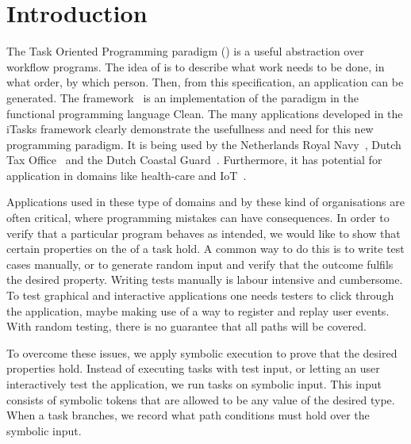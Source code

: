 
\section{Introduction}

The Task Oriented Programming paradigm (\TOP) is a useful abstraction over workflow programs.
The idea of \TOP is to describe what work needs to be done, in what order, by which person.
Then, from this specification, an application can be generated.
The \ITASKS framework~\cite{DBLP:conf/ppdp/PlasmeijerLMAK12} is an implementation of the paradigm in the functional programming language Clean.
The many applications developed in the iTasks framework clearly demonstrate the usefullness and need for this new programming paradigm.
It is being used by the Netherlands Royal Navy~\cite{jansen2018dynamic}, Dutch Tax Office~\cite{conf/sfp/StutterheimAP17} and the Dutch Coastal Guard~\cite{lijnse2012incidone}. %
Furthermore, it has potential for application in domains like health-care and IoT~\cite{DBLP:conf/cgo/KoopmanLP18}.

Applications used in these type of domains and by these kind of organisations are often critical, where programming mistakes can have consequences.
In order to verify that a particular \TOPHAT program behaves as intended,
we would like to show that certain properties on the of a task hold.
A common way to do this is to write test cases manually,
or to generate random input and verify that the outcome fulfils the desired property.
Writing tests manually is labour intensive and cumbersome.
To test graphical and interactive applications one needs testers to click through the application,
maybe making use of a way to register and replay user events.
With random testing, there is no guarantee that all paths will be covered.

To overcome these issues, we apply symbolic execution to prove that the desired properties hold.
Instead of executing tasks with test input, or letting an user interactively test the application,
we run tasks on symbolic input.
This input consists of symbolic tokens that are allowed to be any value of the desired type.
When a task branches, we record what path conditions must hold over the symbolic input.

